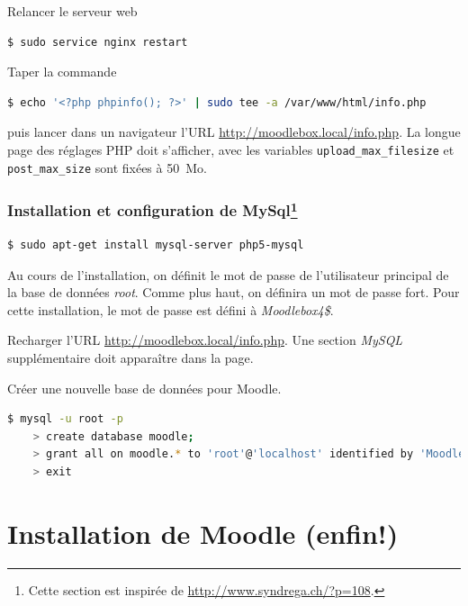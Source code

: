 \documentclass[11pt]{article}
\begin{document}
Relancer le serveur web
\begin{lstlisting}[language=bash]
$ sudo service nginx restart
\end{lstlisting}

\begin{verification}
Taper la commande
\begin{lstlisting}[language=bash]
$ echo '<?php phpinfo(); ?>' | sudo tee -a /var/www/html/info.php
\end{lstlisting}
puis lancer dans un navigateur l'URL \url{http://moodlebox.local/info.php}. La longue page des réglages PHP doit s'afficher, avec les variables \lstinline{upload_max_filesize} et \lstinline{post_max_size} sont fixées à 50~Mo.
\end{verification}

\subsubsection[Installation et configuration de MySql]{Installation et configuration de MySql\footnote{Cette section est inspirée de \url{http://www.syndrega.ch/?p=108}.}}

\begin{lstlisting}[language=bash]
$ sudo apt-get install mysql-server php5-mysql
\end{lstlisting}

Au cours de l'installation, on définit le mot de passe de l'utilisateur principal de la base de données \emph{root}. Comme plus haut,  on définira un mot de passe fort. Pour cette installation, le mot de passe est défini à \emph{Moodlebox4\$}.

\begin{verification}
Recharger l'URL \url{http://moodlebox.local/info.php}. Une section \emph{MySQL} supplémentaire doit apparaître dans la page.
\end{verification}

Créer une nouvelle base de données pour Moodle.

\begin{lstlisting}[language=bash]
$ mysql -u root -p
    > create database moodle;
    > grant all on moodle.* to 'root'@'localhost' identified by 'Moodlebox4$';
    > exit
\end{lstlisting}

\section{Installation de Moodle (enfin!)}
\end{document}
